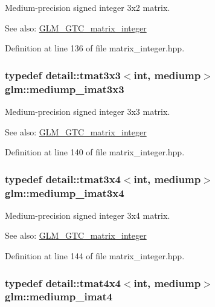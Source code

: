 Medium-precision signed integer 3x2 matrix. \begin{Desc}
\item[See also:]\hyperlink{group__gtc__matrix__integer}{GLM\_\-GTC\_\-matrix\_\-integer} \end{Desc}


Definition at line 136 of file matrix\_\-integer.hpp.\hypertarget{group__gtc__matrix__integer_gc5ee8dc182055bb0a00a90c031d4a714}{
\subsubsection[mediump\_\-imat3x3]{\setlength{\rightskip}{0pt plus 5cm}typedef detail::tmat3x3$<$int, mediump$>$ {\bf glm::mediump\_\-imat3x3}}}
\label{group__gtc__matrix__integer_gc5ee8dc182055bb0a00a90c031d4a714}


Medium-precision signed integer 3x3 matrix. \begin{Desc}
\item[See also:]\hyperlink{group__gtc__matrix__integer}{GLM\_\-GTC\_\-matrix\_\-integer} \end{Desc}


Definition at line 140 of file matrix\_\-integer.hpp.\hypertarget{group__gtc__matrix__integer_gaac79be4db34dde570c3331ffe728d55}{
\subsubsection[mediump\_\-imat3x4]{\setlength{\rightskip}{0pt plus 5cm}typedef detail::tmat3x4$<$int, mediump$>$ {\bf glm::mediump\_\-imat3x4}}}
\label{group__gtc__matrix__integer_gaac79be4db34dde570c3331ffe728d55}


Medium-precision signed integer 3x4 matrix. \begin{Desc}
\item[See also:]\hyperlink{group__gtc__matrix__integer}{GLM\_\-GTC\_\-matrix\_\-integer} \end{Desc}


Definition at line 144 of file matrix\_\-integer.hpp.\hypertarget{group__gtc__matrix__integer_gbf1a0fd4c85a21f67535b737e1feb355}{
\subsubsection[mediump\_\-imat4]{\setlength{\rightskip}{0pt plus 5cm}typedef detail::tmat4x4$<$int, mediump$>$ {\bf glm::mediump\_\-imat4}}}
\label{group__gtc__matrix__integer_gbf1a0fd4c85a21f67535b737e1feb355}


